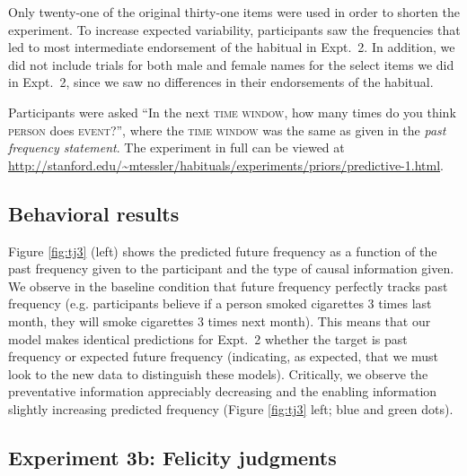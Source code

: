 \documentclass[10pt,letterpaper]{article}
\begin{document}
Only twenty-one of the original thirty-one items were used in order to shorten the experiment.
To increase expected variability, participants saw the frequencies that led to most intermediate endorsement of the habitual in Expt.~2. 
In addition, we did not include trials for both male and female names for the select items we did in Expt.~2, since we saw no differences in their endorsements of the habitual.

Participants were asked ``In the next \textsc{time window}, how many times do you think \textsc{person} does \textsc{event}?'', where the \textsc{time window} was the same as given in the \emph{past frequency statement}.
The experiment in full can be viewed at \url{http://stanford.edu/~mtessler/habituals/experiments/priors/predictive-1.html}.



\subsection{Behavioral results}

Figure \ref{fig:tj3} (left) shows the predicted future frequency as a function of the past frequency given to the participant and the type of causal information given. 
We observe in the baseline condition that future frequency perfectly tracks past frequency (e.g. participants believe if a person smoked cigarettes 3 times last month, they will smoke cigarettes 3 times next month). 
This means that our model makes identical predictions for Expt.~2 whether the target is past frequency or expected future frequency (indicating, as expected, that we must look to the new data to distinguish these models).
Critically, we observe the preventative information appreciably decreasing and the enabling information slightly increasing predicted frequency (Figure \ref{fig:tj3} left; blue and green dots).




\subsection{Experiment 3b: Felicity judgments}
\end{document}
